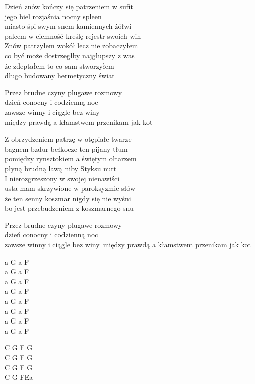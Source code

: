 \begin{text}
    Dzień znów kończy się patrzeniem w sufit\\
    jego biel rozjaśnia nocny spleen\\
    miasto śpi swym snem kamiennych żółwi\\
    palcem w ciemność kreślę rejestr swoich win\\
    Znów patrzyłem wokół lecz nie zobaczyłem\\
    co być może dostrzegłby najgłupszy z was\\
    że zdeptałem to co sam stworzyłem\\
    długo budowany hermetyczny świat

    Przez brudne czyny plugawe rozmowy\\
    dzień conocny i codzienną noc\\
    zawsze winny i ciągle bez winy\\
    między prawdą a kłamstwem przenikam jak kot

    Z obrzydzeniem patrzę w otępiałe twarze\\
    bagnem bzdur bełkocze ten pijany tłum\\
    pomiędzy rynsztokiem a świętym ołtarzem\\
    płyną brudną lawą niby Styksu nurt\\
    I nierozgrzeszony w swojej nienawiści\\
    usta mam skrzywione w paroksyzmie słów\\
    że ten senny koszmar nigdy się nie wyśni\\
    bo jest przebudzeniem z koszmarnego snu

    Przez brudne czyny plugawe rozmowy\\
    dzień conocny i codzienną noc\\
    zawsze winny i ciągle bez winy\
    między prawdą a kłamstwem przenikam jak kot
\end{text}
\begin{chord}
    a G a F\\
    a G a F\\
    a G a F\\
    a G a F\\
    a G a F\\
    a G a F\\
    a G a F\\
    a G a F

    C G F G\\
    C G F G\\
    C G F G\\
    C G FEa
\end{chord}